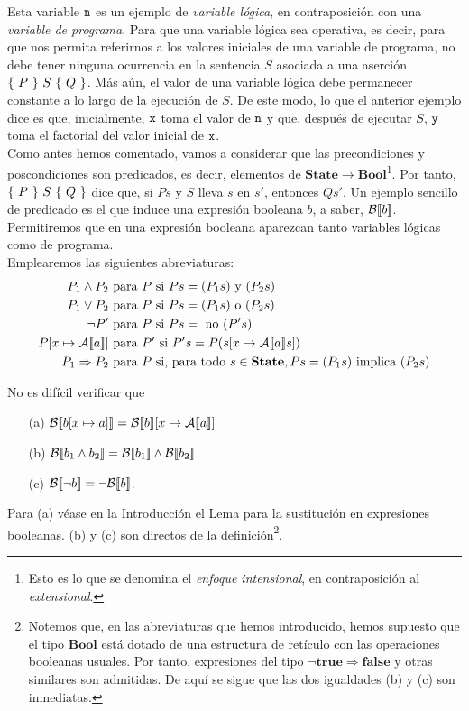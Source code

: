 Esta variable $\texttt{n}$ es un ejemplo de \textit{variable lógica}, en contraposición con una \textit{variable de programa}. Para que una variable lógica sea operativa, es decir, para que nos permita referirnos a los valores iniciales de una variable de programa, no debe tener ninguna ocurrencia en la sentencia $S$ asociada a una aserción $\{\, \, P \, \, \}\, \, S\, \, \{ \, \, Q \, \, \}$. Más aún, el valor de una variable lógica debe permanecer constante a lo largo de la ejecución de $S$. De este modo, lo que el anterior ejemplo dice es que, inicialmente, $\texttt{x}$ toma el valor de $\texttt{n}$ y que, después de ejecutar $S$, $\texttt{y}$ toma el factorial del valor inicial de $\texttt{x}$. 
\\

Como antes hemos comentado, vamos a considerar que las precondiciones y poscondiciones son predicados, es decir, elementos de $\mathbf{State} \to \mathbf{Bool}$\footnote{Esto es lo que se denomina el \textit{enfoque intensional}, en contraposición al \textit{extensional}.}. Por tanto, $\{\, \, P \, \, \}\, \, S\, \, \{ \, \, Q \, \, \}$ dice que, si $Ps$ y $S$ lleva $s$ en $s'$, entonces $Qs'$. Un ejemplo sencillo de predicado es el que induce una expresión booleana $b$, a saber, $\mathcal{B}[\![b]\!]$. Permitiremos que en una expresión booleana aparezcan tanto variables lógicas como de programa. 
\\

Emplearemos las siguientes abreviaturas:
\begin{align*}
    P_1 \land P_2 & \text{ para } P  \text{ si } Ps = (P_1s) \text{ y } (P_2s)\\ 
    P_1 \lor P_2 & \text{ para } P  \text{ si } Ps = (P_1s) \text{ o } (P_2s)\\ 
    \neg P' & \text{ para } P \text{ si } Ps = \text{ no }(P's)\\ 
    P[x \mapsto \mathcal{A}[\![a]\!]] & \text{ para } P'  \text{ si } P's = P(s[x \mapsto \mathcal{A}[\![a]\!]s])\\ 
    P_1 \Rightarrow P_2 & \text{ para } P  \text{ si, para todo }s \in \mathbf{State}, Ps = (P_1s) \text{ implica } (P_2s)
\end{align*}

\begin{example}
No es difícil verificar que
\begin{itemize}
    \item[(a)] $\mathcal{B}[\![b[x\mapsto a]]\!] = \mathcal{B}[\![b]\!][x \mapsto \mathcal{A}[\![a]\!]]$
    \item[(b)] $\mathcal{B}[\![b_1 \land b_2]\!] = \mathcal{B}[\![b_1]\!] \land \mathcal{B}[\![b_2]\!]$.
    \item[(c)] $\mathcal{B}[\![\neg b]\!] = \neg \mathcal{B}[\![b]\!]$.
\end{itemize}
Para (a) véase en la Introducción el Lema para la sustitución en expresiones booleanas. (b) y (c) son directos de la definición\footnote{Notemos que, en las abreviaturas que hemos introducido, hemos supuesto que el tipo $\mathbf{Bool}$ está dotado de una estructura de retículo con las operaciones booleanas usuales. Por tanto, expresiones del tipo $\neg \mathbf{true} \Rightarrow \mathbf{false}$ y otras similares son admitidas. De aquí se sigue que las dos igualdades (b) y (c) son inmediatas.}.
\end{example}

